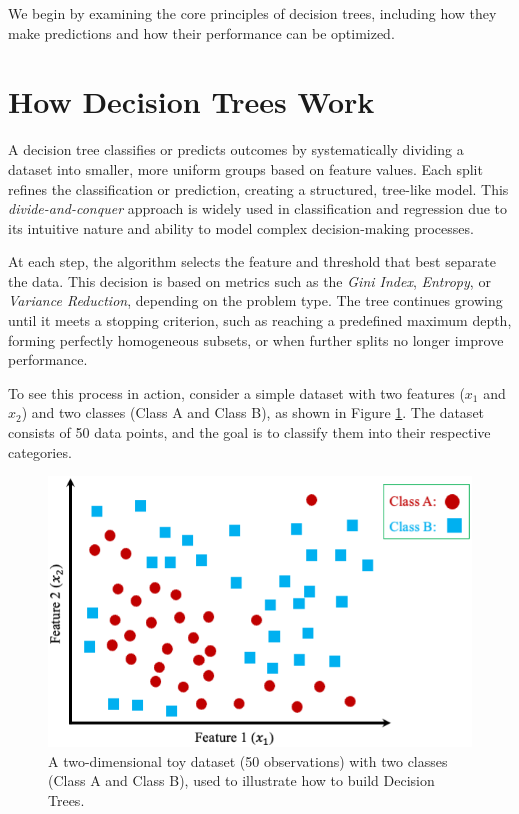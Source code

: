 \documentclass[
]{book}
\theoremstyle{definition}
\theoremstyle{definition}
\theoremstyle{definition}
\theoremstyle{definition}
\theoremstyle{remark}
\begin{document}
We begin by examining the core principles of decision trees, including how they make predictions and how their performance can be optimized.

\section{How Decision Trees Work}\label{how-decision-trees-work}

A decision tree classifies or predicts outcomes by systematically dividing a dataset into smaller, more uniform groups based on feature values. Each split refines the classification or prediction, creating a structured, tree-like model. This \emph{divide-and-conquer} approach is widely used in classification and regression due to its intuitive nature and ability to model complex decision-making processes.

At each step, the algorithm selects the feature and threshold that best separate the data. This decision is based on metrics such as the \emph{Gini Index}, \emph{Entropy}, or \emph{Variance Reduction}, depending on the problem type. The tree continues growing until it meets a stopping criterion, such as reaching a predefined maximum depth, forming perfectly homogeneous subsets, or when further splits no longer improve performance.

To see this process in action, consider a simple dataset with two features (\(x_1\) and \(x_2\)) and two classes (Class A and Class B), as shown in Figure \ref{fig:tree-1}. The dataset consists of 50 data points, and the goal is to classify them into their respective categories.

\begin{figure}

{\centering \includegraphics[width=0.7\linewidth]{images/ex_tree_1} 

}

\caption{A two-dimensional toy dataset (50 observations) with two classes (Class A and Class B), used to illustrate how to build Decision Trees.}\label{fig:tree-1}
\end{figure}
\end{document}

